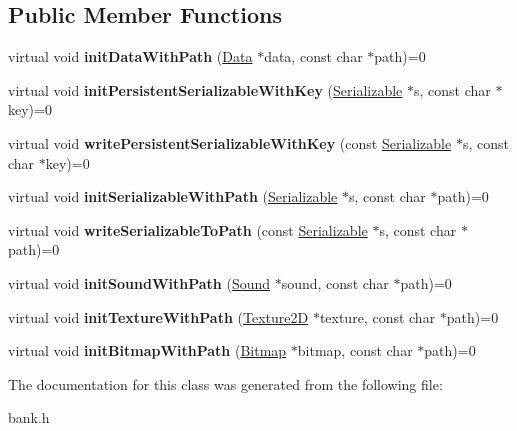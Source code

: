 \subsection*{Public Member Functions}
\begin{DoxyCompactItemize}
\item 
\hypertarget{classg2c_1_1_bank_aaa72c961f138d413dc8a8f94674def3f}{
virtual void {\bfseries initDataWithPath} (\hyperlink{classg2c_1_1_data}{Data} $\ast$data, const char $\ast$path)=0}
\label{classg2c_1_1_bank_aaa72c961f138d413dc8a8f94674def3f}

\item 
\hypertarget{classg2c_1_1_bank_a667198355eaab8b14e9eb3b74517e863}{
virtual void {\bfseries initPersistentSerializableWithKey} (\hyperlink{classg2c_1_1_serializable}{Serializable} $\ast$s, const char $\ast$key)=0}
\label{classg2c_1_1_bank_a667198355eaab8b14e9eb3b74517e863}

\item 
\hypertarget{classg2c_1_1_bank_a1d8081b137d998abd567d32405ec56b3}{
virtual void {\bfseries writePersistentSerializableWithKey} (const \hyperlink{classg2c_1_1_serializable}{Serializable} $\ast$s, const char $\ast$key)=0}
\label{classg2c_1_1_bank_a1d8081b137d998abd567d32405ec56b3}

\item 
\hypertarget{classg2c_1_1_bank_a40d817e1b28aa72c5e33b6a42c20c2a9}{
virtual void {\bfseries initSerializableWithPath} (\hyperlink{classg2c_1_1_serializable}{Serializable} $\ast$s, const char $\ast$path)=0}
\label{classg2c_1_1_bank_a40d817e1b28aa72c5e33b6a42c20c2a9}

\item 
\hypertarget{classg2c_1_1_bank_a66d420829fee68d113526e6d96cd1b3e}{
virtual void {\bfseries writeSerializableToPath} (const \hyperlink{classg2c_1_1_serializable}{Serializable} $\ast$s, const char $\ast$path)=0}
\label{classg2c_1_1_bank_a66d420829fee68d113526e6d96cd1b3e}

\item 
\hypertarget{classg2c_1_1_bank_abf6bf97f111007e22554275760805e21}{
virtual void {\bfseries initSoundWithPath} (\hyperlink{classg2c_1_1_sound}{Sound} $\ast$sound, const char $\ast$path)=0}
\label{classg2c_1_1_bank_abf6bf97f111007e22554275760805e21}

\item 
\hypertarget{classg2c_1_1_bank_abc03f2770abc1d5cc2f3a970fa01a6f3}{
virtual void {\bfseries initTextureWithPath} (\hyperlink{classg2c_1_1_texture2_d}{Texture2D} $\ast$texture, const char $\ast$path)=0}
\label{classg2c_1_1_bank_abc03f2770abc1d5cc2f3a970fa01a6f3}

\item 
\hypertarget{classg2c_1_1_bank_adeb9a83097a213f4fa90026e46197847}{
virtual void {\bfseries initBitmapWithPath} (\hyperlink{classg2c_1_1_bitmap}{Bitmap} $\ast$bitmap, const char $\ast$path)=0}
\label{classg2c_1_1_bank_adeb9a83097a213f4fa90026e46197847}

\end{DoxyCompactItemize}


The documentation for this class was generated from the following file:\begin{DoxyCompactItemize}
\item 
bank.h\end{DoxyCompactItemize}
